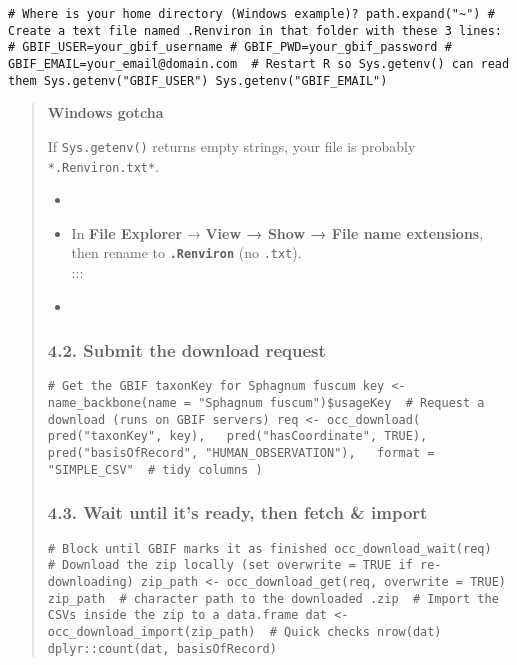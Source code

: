 \documentclass[
  letterpaper,
  DIV=11,
  numbers=noendperiod]{scrartcl}
\begin{document}
\begin{tcolorbox}
\begin{verbatim}
# Where is your home directory (Windows example)? path.expand("~") # Create a text file named .Renviron in that folder with these 3 lines: # GBIF_USER=your_gbif_username # GBIF_PWD=your_gbif_password # GBIF_EMAIL=your_email@domain.com  # Restart R so Sys.getenv() can read them Sys.getenv("GBIF_USER") Sys.getenv("GBIF_EMAIL") 
\end{verbatim}

\begin{quote}
\textbf{Windows gotcha}

If \texttt{Sys.getenv()} returns empty strings, your file is probably
\texttt{*.Renviron.txt*}.

\begin{itemize}
\item
\item
  In \textbf{File Explorer} → \textbf{View → Show → File name
  extensions}, then rename to \textbf{\texttt{.Renviron}} (no
  \texttt{.txt}).\\

  :::
\item
\end{itemize}

\subsubsection{4.2. Submit the download
request}\label{submit-the-download-request}

\begin{verbatim}
# Get the GBIF taxonKey for Sphagnum fuscum key <- name_backbone(name = "Sphagnum fuscum")$usageKey  # Request a download (runs on GBIF servers) req <- occ_download(   pred("taxonKey", key),   pred("hasCoordinate", TRUE),   pred("basisOfRecord", "HUMAN_OBSERVATION"),   format = "SIMPLE_CSV"  # tidy columns ) 
\end{verbatim}

\subsubsection{4.3. Wait until it's ready, then fetch \&
import}\label{wait-until-its-ready-then-fetch-import}

\begin{verbatim}
# Block until GBIF marks it as finished occ_download_wait(req)  # Download the zip locally (set overwrite = TRUE if re-downloading) zip_path <- occ_download_get(req, overwrite = TRUE) zip_path  # character path to the downloaded .zip  # Import the CSVs inside the zip to a data.frame dat <- occ_download_import(zip_path)  # Quick checks nrow(dat) dplyr::count(dat, basisOfRecord) 
\end{verbatim}


\end{quote}
\end{tcolorbox}
\end{document}
